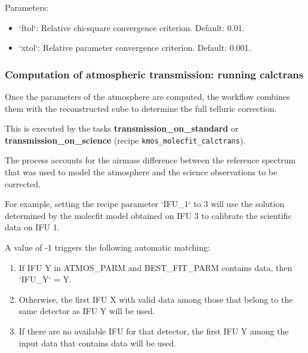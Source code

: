 Parameters:
\begin{itemize}
\item `ftol`: Relative chi-square convergence criterion. Default: 0.01.
\item `xtol`: Relative parameter convergence criterion. Default: 0.001.
\end{itemize}


\subsubsection{Computation of atmospheric transmission: running calctrans}
\label{sec:calctrans}

Once the parameters of the atmosphere are computed,
the workflow combines them with the reconstructed cube to determine the full telluric correction.

This is executed by the tasks \textbf{transmission\_on\_standard} or \textbf{transmission\_on\_science}
(recipe {\tt kmos\_molecfit\_calctrans}).

The process accounts for the airmass difference between the reference spectrum that was used to model the atmosphere
and the science observations to be corrected.

For example, setting the recipe parameter `IFU\_1` to 3
will use the solution determined by the molecfit model obtained on IFU 3 to calibrate the scientific data
on IFU 1.

A value of -1 triggers the following automatic matching:
\begin{enumerate}
\item If IFU Y in ATMOS\_PARM and BEST\_FIT\_PARM contains data, then `IFU\_Y` = Y.
\item Otherwise, the first IFU X with valid data among those that belong to the same detector as IFU Y will be used.
\item If there are no available IFU for that detector, the first IFU Y among the input data that contains data will be used.
\end{enumerate}

